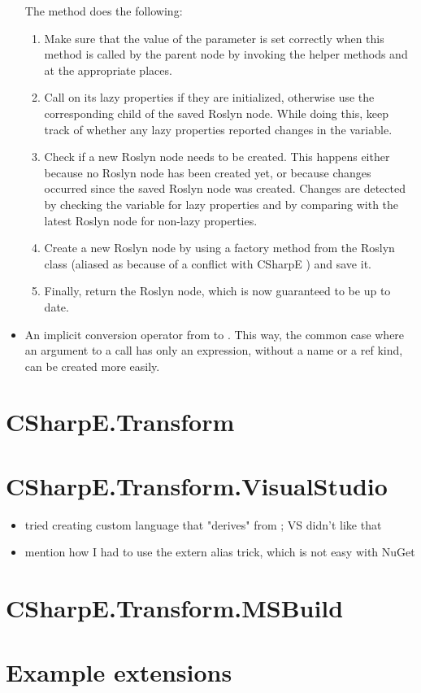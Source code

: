 \begin{itemize}
The method does the following:

\begin{enumerate}
\item Make sure that the value of the  parameter is set correctly when this method is called by the parent node by invoking the helper methods  and  at the appropriate places.
\item Call  on its lazy properties if they are initialized, otherwise use the corresponding child of the saved Roslyn node. While doing this, keep track of whether any lazy properties reported changes in the  variable.
\item Check if a new Roslyn node needs to be created. This happens either because no Roslyn node has been created yet, or because changes occurred since the saved Roslyn node was created. Changes are detected by checking the  variable for lazy properties and by comparing with the latest Roslyn node for non-lazy properties.
\item Create a new Roslyn node by using a factory method from the Roslyn  class (aliased as  because of a conflict with CSharpE ) and save it.
\item Finally, return the Roslyn node, which is now guaranteed to be up to date.
\end{enumerate}

\item An implicit conversion operator from  to . This way, the common case where an argument to a call has only an expression, without a name or a ref kind, can be created more easily.
\end{itemize}

\section{CSharpE.Transform}

\section{CSharpE.Transform.VisualStudio}

\begin{itemize}
\item tried creating custom language that "derives" from ; VS didn't like that
\item mention how I had to use the extern alias trick, which is not easy with NuGet
\end{itemize}

\section{CSharpE.Transform.MSBuild}

\section{Example extensions}

